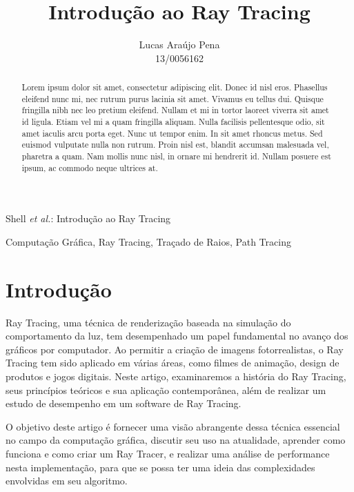 \documentclass[journal]{IEEEtran}
\begin{document}
\title{Introdução ao Ray Tracing}

\author{ Lucas Araújo Pena \\ 
         13/0056162 }

%
{Shell \MakeLowercase{\textit{et al.}}: Introdução ao Ray Tracing}

\maketitle

\begin{abstract}
Lorem ipsum dolor sit amet, consectetur adipiscing elit. Donec id nisl eros. 
Phasellus eleifend nunc mi, nec rutrum purus lacinia sit amet. Vivamus eu 
tellus dui. Quisque fringilla nibh nec leo pretium eleifend. Nullam et mi in 
tortor laoreet viverra sit amet id ligula. Etiam vel mi a quam fringilla 
aliquam. Nulla facilisis pellentesque odio, sit amet iaculis arcu porta 
eget. Nunc ut tempor enim. In sit amet rhoncus metus. Sed euismod vulputate 
nulla non rutrum. Proin nisl est, blandit accumsan malesuada vel, pharetra a 
quam. Nam mollis nunc nisl, in ornare mi hendrerit id. Nullam posuere est 
ipsum, ac commodo neque ultrices at.
\end{abstract}


\begin{IEEEkeywords}
Computação Gráfica, Ray Tracing, Traçado de Raios, Path Tracing
\end{IEEEkeywords}

\section{Introdução}

 Ray Tracing, uma técnica de renderização baseada na simulação do 
comportamento da luz, tem desempenhado um papel fundamental no avanço
dos gráficos por computador. Ao permitir a criação de imagens fotorrealistas, 
o Ray Tracing tem sido aplicado em várias áreas, como filmes de animação,
design de produtos e jogos digitais. Neste artigo, examinaremos a história 
do Ray Tracing, seus princípios teóricos e sua aplicação contemporânea, além 
de realizar um estudo de desempenho em um software de Ray Tracing. 

O objetivo deste artigo é fornecer uma visão abrangente dessa técnica essencial
no campo da computação gráfica, discutir seu uso na atualidade, aprender como
funciona e como criar um Ray Tracer, e realizar uma análise de performance nesta
implementação, para que se possa ter uma ideia das complexidades envolvidas em
seu algoritmo.
\end{document}
